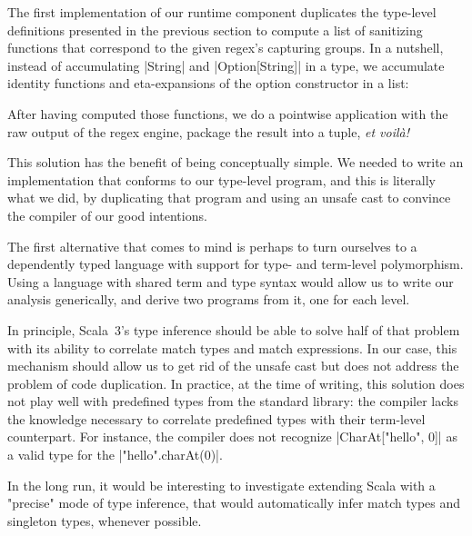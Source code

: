 The first implementation of our runtime component duplicates the type-level definitions presented in the previous section to compute a list of sanitizing functions that correspond to the given regex's capturing groups.
In a nutshell, instead of accumulating |String| and |Option[String]| in a type, we accumulate identity functions and eta-expansions of the option constructor in a list:

\regexTermLvlLoop

\noindent
After having computed those functions, we do a pointwise application with the raw output of the regex engine, package the result into a tuple, \emph{et voilà!}

\regexTransform

This solution has the benefit of being conceptually simple.
We needed to write an implementation that conforms to our type-level program, and this is literally what we did, by duplicating that program and using an unsafe cast to convince the compiler of our good intentions.

The first alternative that comes to mind is perhaps to turn ourselves to a dependently typed language with support for type- and term-level polymorphism.
Using a language with shared term and type syntax would allow us to write our analysis generically, and derive two programs from it, one for each level.

In principle, Scala~3's type inference should be able to solve half of that problem with its ability to correlate match types and match expressions.%
%
In our case, this mechanism should allow us to get rid of the unsafe cast but does not address the problem of code duplication.
In practice, at the time of writing, this solution does not play well with predefined types from the standard library: the compiler lacks the knowledge necessary to correlate predefined types with their term-level counterpart.
For instance, the compiler does not recognize |CharAt["hello", 0]| as a valid type for the |"hello".charAt(0)|.

In the long run, it would be interesting to investigate extending Scala with a "precise" mode of type inference, that would automatically infer match types and singleton types, whenever possible.

